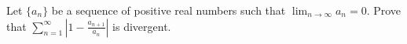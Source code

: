 Let $\lbrace a_n \rbrace$ be a sequence of positive real numbers such that
$\displaystyle{\lim_{n \to \infty} a_n = 0}$. Prove that
$\displaystyle{\sum_{n=1}^{\infty} \left| 1 - \frac{a_{n+1}}{a_n} \right|}$ is
divergent.
